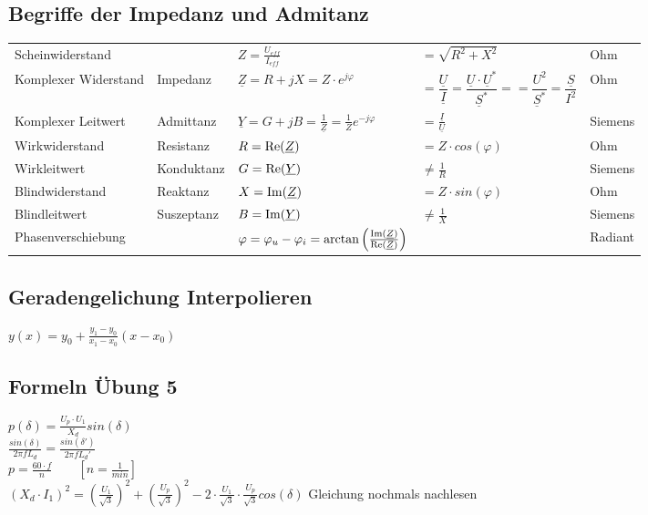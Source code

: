 	\subsection{Begriffe der Impedanz und Admitanz}
	\begin{tabular}{lllll}
		Scheinwiderstand & & $Z = \frac{U_{eff}}{I_{eff}} $ & $ =
		\sqrt{R^2+X^2}$ & Ohm\\ Komplexer Widerstand & Impedanz & $\underline Z = R + jX = Z \cdot e^{j \varphi}$ 
		& $  = \dfrac{\underline{U}}{\underline{I}} = \dfrac{\underline{U}\cdot\underline{U}^{\ast}}{\underline{S}^*} =  = \dfrac{U^2}{\underline{S}^*} = 
		\dfrac{\underline{S}}{I^2}$ & Ohm\\
		Komplexer Leitwert & Admittanz & $\underline Y = G + jB =
		\frac{1}{\underline Z} = \frac{1}{Z}e^{-j\varphi}$ & $= \frac{\underline{I}}{\underline{U}}$ &  Siemens\\
		Wirkwiderstand & Resistanz & $R = \operatorname{Re}(\underline Z) $ & $ = Z
		\cdot cos(\varphi)$ & Ohm\\
		Wirkleitwert & Konduktanz & $G = \operatorname{Re}(\underline Y) $ & $ \neq \frac{1}{R}$ &
		Siemens\\
		Blindwiderstand & Reaktanz & $X = \operatorname{Im}(\underline Z) $ & $ = Z
		\cdot sin(\varphi)$ & Ohm\\
		Blindleitwert & Suszeptanz & $B = \operatorname{Im}( \underline Y) $ & $ \neq \frac{1}{X}$
		& Siemens\\
		Phasenverschiebung & & $\varphi = \varphi_u - \varphi_i =
		\arctan\left(\frac{\operatorname{Im}(\underline{Z})}{\operatorname{Re}(\underline{Z})}\right)$ & &
		Radiant\\
		
	\end{tabular}
	
	\subsection{Geradengelichung Interpolieren}
	
	$ y(x)=y_0 + \frac{y_1 - y_0}{x_1 - x_0}(x-x_0) $
	
	\subsection{Formeln Übung 5}
	
	$ p(\delta)=\frac{U_p \cdot U_1}{X_d} sin(\delta) $
	\\
	$ \frac{sin(\delta)}{2\pi f L_d}=\frac{sin(\delta ')}{2\pi f L_d '} $
	\\
	$ p=\frac{60 \cdot f}{n} \qquad \left[n= \frac{1}{min}\right] $
	\\
	$ (X_d \cdot I_1)^2=(\frac{U_1}{\sqrt{3}})^2+(\frac{U_p}{\sqrt{3}})^2 - 2\cdot \frac{U_1}{\sqrt{3}}\cdot \frac{U_p}{\sqrt{3}} cos(\delta) $ Gleichung nochmals nachlesen
	